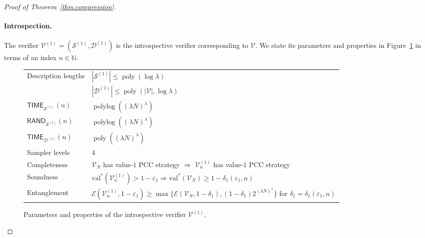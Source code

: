 \documentclass[11pt]{article}
\theoremstyle{definition}
\newcommand{\N}{\ensuremath{\mathbb{N}}}
\DeclareMathOperator{\poly}{poly}
\newcommand{\val}{\ensuremath{\mathrm{val}}}
\newcommand{\eps}{\varepsilon}
\DeclareMathOperator{\polylog}{polylog}
\newcommand{\abs}[1]{\left\vert {#1} \right\vert}
\newcommand{\sampler}{\mathcal{S}}
\newcommand{\decider}{\mathcal{D}}
\newcommand{\verifier}{\mathcal{V}}
\newcommand{\Ent}{\mathscr{E}}
\newcommand{\TIME}{\mathsf{TIME}}
\newcommand{\RAND}{\mathsf{RAND}}
\begin{document}
\begin{proof}[Proof of Theorem~\ref{thm:compression}]
  \paragraph{Introspection.}
  The verifier $\verifier^{(1)} = (\sampler^{(1)},\decider^{(1)})$ is the
  introspective verifier corresponding to $\verifier$.
  We state its parameters and properties in Figure~\ref{tab:intro} in terms of
  an index $n \in \N$.

  \begin{figure}[H]
    \begin{center}
      \renewcommand{\arraystretch}{1.2}
      \begin{tabularx}{0.8\textwidth}{l X}
        \toprule \multirow{2}{*}{Description lengths}
        & $|\sampler^{(1)}| \leq \poly(\log\lambda)$ \\
        & $|\decider^{(1)}| \leq \poly(\abs{\verifier}, \log \lambda)$ \\
        $\TIME_{\sampler^{(1)}}(n)$
        & $\polylog \left ( (\lambda N)^\lambda \right)$ \\
        $\RAND_{\sampler^{(1)}}(n)$
        & $\polylog \left ((\lambda N)^\lambda \right)$ \\
        $\TIME_{\decider^{(1)}}(n)$
        & $\poly \left ((\lambda N)^\lambda\right)$  \\
        Sampler levels & $4$ \\
        Completeness & $\verifier_N$ has value-$1$ PCC strategy $\Rightarrow$
        $\verifier^{(1)}_n$ has value-$1$ PCC strategy \\
        Soundness & $\val^*(\verifier^{(1)}_n) > 1 - \eps_1 \Rightarrow
        \val^*(\verifier_N) \geq 1 - \delta_1(\eps_1,n)$ \\
        Entanglement & $\Ent(\verifier_n^{(1)},1 - \eps_1) \geq \max {\bigl\{\Ent(\verifier_N,1 - \delta_1), (1 - \delta_1)2^{(\lambda N)^\lambda} \bigr\}}$
        for $\delta_1 = \delta_1(\eps_1,n)$ \\
        \bottomrule
      \end{tabularx}
      \caption{Parameters and properties of the introspective verifier
        $\verifier^{(1)}$.}
      \label{tab:intro}
    \end{center}
  \end{figure}


\end{proof}
\end{document}
